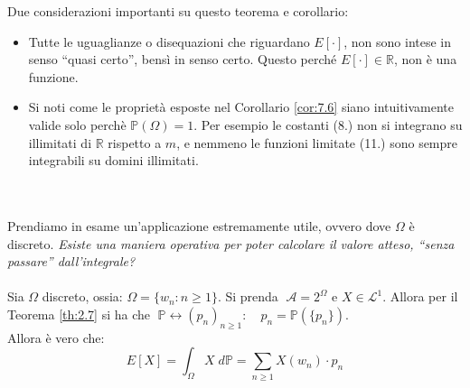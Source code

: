 \noindent Due considerazioni importanti su questo teorema e corollario:
\begin{itemize}
    \item Tutte le uguaglianze o disequazioni che riguardano $E[\cdot]$, non sono intese in senso ``quasi certo'', bensì in senso certo. Questo perché $E[\cdot]\in\mathbb{R}$, non è una funzione.
    \item Si noti come le proprietà esposte nel Corollario \ref{cor:7.6} siano intuitivamente valide solo perchè $\mathbb{P}(\Omega) = 1$. Per esempio le costanti (8.) non si integrano su illimitati di $\mathbb{R}$ rispetto a $m$, e nemmeno le funzioni limitate (11.) sono sempre integrabili su domini illimitati.
\end{itemize}

\bigskip
\noindent
{}\\
\\
Prendiamo in esame un'applicazione estremamente utile, ovvero dove $\Omega$ è discreto. \textit{Esiste una maniera operativa per poter calcolare il valore atteso, ``senza passare'' dall'integrale?}\\
\\
Sia $\Omega$ discreto, ossia: $\Omega = \{w_n:n\geq1\}$. Si prenda $\;\mathcal{A} = 2^\Omega$ e $X\in\mathcal{L}^1$. Allora per il Teorema \ref{th:2.7} si ha che $\;\mathbb{P}\leftrightarrow (p_n)_{n\geq1}:\quad p_n = \mathbb{P}(\{p_n\}).$ \\
Allora è vero che:
\[\boxed{E[X] = \int_\Omega X\;d\mathbb{P} = \sum_{n\geq1} X(w_n)\cdot p_n}\]

